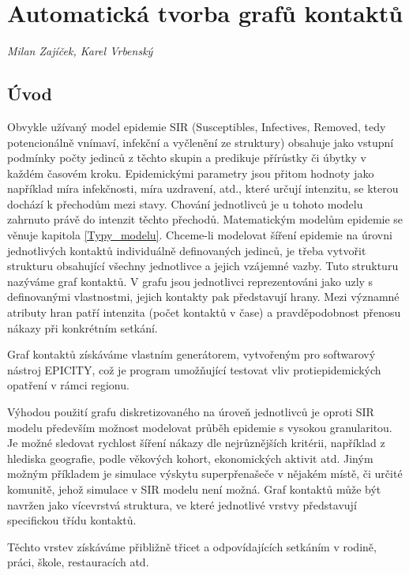 
\chapter{Automatická tvorba grafů kontaktů}\label{Grafy_kontaktu}

\textit{Milan Zajíček, Karel Vrbenský}
\vspace{15mm}

\section*{Úvod}

Obvykle užívaný model epidemie SIR (Susceptibles, Infectives, Removed, tedy potencionálně vnímaví, infekční a vyčlenění ze struktury) obsahuje jako vstupní podmínky počty jedinců z těchto skupin a predikuje přírůstky či úbytky v každém časovém kroku. Epidemickými parametry jsou přitom hodnoty jako například míra infekčnosti, míra uzdravení, atd., které určují intenzitu, se kterou dochází k přechodům mezi stavy. Chování jednotlivců je u tohoto modelu zahrnuto právě do intenzit těchto přechodů. Matematickým modelům epidemie se věnuje kapitola \ref{Typy_modelu}. Chceme-li modelovat šíření epidemie na úrovni jednotlivých kontaktů individuálně definovaných jedinců, je třeba vytvořit strukturu obsahující všechny jednotlivce a jejich vzájemné vazby. Tuto strukturu nazýváme graf kontaktů. V grafu jsou jednotlivci reprezentováni jako uzly s definovanými vlastnostmi, jejich kontakty pak představují hrany. Mezi významné atributy hran patří intenzita (počet kontaktů v čase) a pravděpodobnost přenosu nákazy při konkrétním setkání. 

Graf kontaktů získáváme vlastním generátorem, vytvořeným pro softwarový nástroj EPICITY, což je program umožňující testovat vliv protiepidemických opatření v rámci regionu.

Výhodou použití grafu diskretizovaného na úroveň jednotlivců je oproti SIR modelu především možnost modelovat průběh epidemie s vysokou granularitou. Je možné sledovat rychlost šíření nákazy dle nejrůznějších kritérii, například z hlediska geografie, podle věkových kohort, ekonomických aktivit atd.  Jiným možným příkladem je simulace výskytu superpřenašeče v nějakém místě, či určité komunitě, jehož simulace v SIR modelu není možná.
Graf kontaktů může být navržen jako vícevrstvá struktura, ve které jednotlivé vrstvy představují specifickou třídu kontaktů. 


Těchto vrstev získáváme přibližně třicet a odpovídajících setkáním v rodině, práci, škole, restauracích atd.


